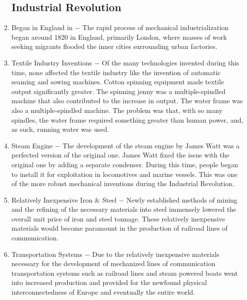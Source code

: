 \documentclass[12pt]{article}
\begin{document}
\begin{enumerate}
\subsection{Industrial Revolution}  

\item Began in England in $-$ The rapid process of mechanical industrialization began around 1820 in England, primarily London, where masses of work seeking migrants flooded the inner cities surrounding urban factories.

\item Textile Industry Inventions $-$ Of the many technologies invented during this time, none affected the textile industry like the invention of automatic seaming and sowing machines. Cotton spinning equipment made textile output significantly greater. The spinning jenny was a multiple-spindled machine that also contributed to the increase in output. The water frame was also a multiple-spindled machine. The problem was that, with so many spindles, the water frame required something greater than human power, and, as such, running water was used. 

\item Steam Engine $-$ The development of the steam engine by James Watt was a perfected version of the original one. James Watt fixed the issue with the original one by adding a separate condenser. During this time, people began to install it for exploitation in locomotives and marine vessels. This was one of the more robust mechanical inventions during the Industrial Revolution.

\item Relatively Inexpensive Iron \& Steel $-$ Newly established methods of mining and the refining of the necessary materials into steel immensely lowered the overall unit price of iron and steel tonnage. These relatively inexpensive materials would become paramount in the production of railroad lines of communication.

\item Transportation Systems $-$ Due to the relatively inexpensive materials necessary for the development of mechanized lines of communication transportation systems such as railroad lines and steam powered boats went into increased production and provided for the newfound physical interconnectedness of Europe and eventually the entire world.

\begin{enumerate}[label=\arabic{*}.]
\setcounter{enumii}{383}


\end{enumerate}
\end{enumerate}
\end{document}
